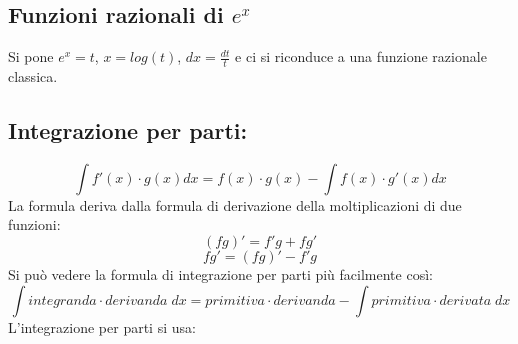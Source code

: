 \documentclass[a4paper, 9pt]{report}
\begin{document}
\subsection*{Funzioni razionali di $e^x$}
Si pone $e^x = t$, $x= log(t)$, $dx = \frac{dt}{t}$ e ci si riconduce a una funzione razionale classica.
\subsection*{Integrazione per parti:}
\[
    \int f'(x) \cdot  g(x) dx = f(x) \cdot g(x) - \int f(x) \cdot g'(x)dx
\]
La formula deriva dalla formula di derivazione della moltiplicazioni di due funzioni:
\[
    (fg)' = f'g + fg'
\]
\[
    fg' = (fg)' - f'g
\]
Si può vedere la formula di integrazione per parti più facilmente così:
\[
    \int integranda \cdot derivanda \; dx = primitiva \cdot derivanda - \int primitiva \cdot derivata \; dx
\]
L'integrazione per parti si usa:
\end{document}
